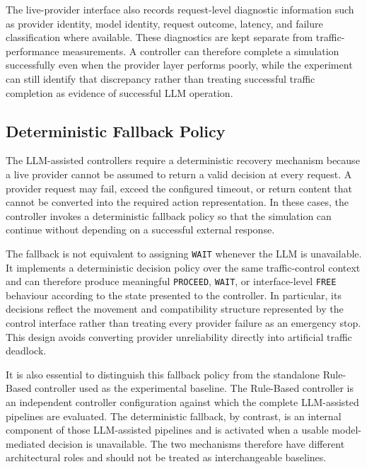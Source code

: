 \documentclass[letterpaper,10pt,conference]{ieeeconf}
\begin{document}
The live-provider interface also records request-level diagnostic information such as provider identity, model identity, request outcome, latency, and failure classification where available. These diagnostics are kept separate from traffic-performance measurements. A controller can therefore complete a simulation successfully even when the provider layer performs poorly, while the experiment can still identify that discrepancy rather than treating successful traffic completion as evidence of successful LLM operation.



\subsection{Deterministic Fallback Policy}



The LLM-assisted controllers require a deterministic recovery mechanism because a live provider cannot be assumed to return a valid decision at every request. A provider request may fail, exceed the configured timeout, or return content that cannot be converted into the required action representation. In these cases, the controller invokes a deterministic fallback policy so that the simulation can continue without depending on a successful external response.



The fallback is not equivalent to assigning \texttt{WAIT} whenever the LLM is unavailable. It implements a deterministic decision policy over the same traffic-control context and can therefore produce meaningful \texttt{PROCEED}, \texttt{WAIT}, or interface-level \texttt{FREE} behaviour according to the state presented to the controller. In particular, its decisions reflect the movement and compatibility structure represented by the control interface rather than treating every provider failure as an emergency stop. This design avoids converting provider unreliability directly into artificial traffic deadlock.



It is also essential to distinguish this fallback policy from the standalone Rule-Based controller used as the experimental baseline. The Rule-Based controller is an independent controller configuration against which the complete LLM-assisted pipelines are evaluated. The deterministic fallback, by contrast, is an internal component of those LLM-assisted pipelines and is activated when a usable model-mediated decision is unavailable. The two mechanisms therefore have different architectural roles and should not be treated as interchangeable baselines.
\end{document}
